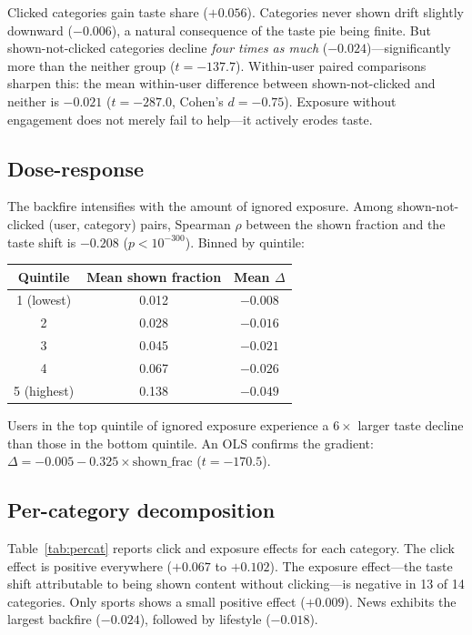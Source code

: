 \documentclass[11pt]{article}
\begin{document}
Clicked categories gain taste share ($+0.056$). Categories never shown drift slightly downward ($-0.006$), a natural consequence of the taste pie being finite. But shown-not-clicked categories decline \emph{four times as much} ($-0.024$)---significantly more than the neither group ($t = -137.7$). Within-user paired comparisons sharpen this: the mean within-user difference between shown-not-clicked and neither is $-0.021$ ($t = -287.0$, Cohen's $d = -0.75$). Exposure without engagement does not merely fail to help---it actively erodes taste.

\subsection*{Dose-response}

The backfire intensifies with the amount of ignored exposure. Among shown-not-clicked (user, category) pairs, Spearman $\rho$ between the shown fraction and the taste shift is $-0.208$ ($p < 10^{-300}$). Binned by quintile:

\begin{center}
\begin{tabular}{ccc}
\toprule
Quintile & Mean shown fraction & Mean $\Delta$ \\
\midrule
1 (lowest) & 0.012 & $-0.008$ \\
2 & 0.028 & $-0.016$ \\
3 & 0.045 & $-0.021$ \\
4 & 0.067 & $-0.026$ \\
5 (highest) & 0.138 & $-0.049$ \\
\bottomrule
\end{tabular}
\end{center}

Users in the top quintile of ignored exposure experience a $6\times$ larger taste decline than those in the bottom quintile. An OLS confirms the gradient: $\Delta = -0.005 - 0.325 \times \text{shown\_frac}$ ($t = -170.5$).

\subsection*{Per-category decomposition}

Table~\ref{tab:percat} reports click and exposure effects for each category. The click effect is positive everywhere ($+0.067$ to $+0.102$). The exposure effect---the taste shift attributable to being shown content without clicking---is negative in 13 of 14 categories. Only sports shows a small positive effect ($+0.009$). News exhibits the largest backfire ($-0.024$), followed by lifestyle ($-0.018$).
\end{document}
